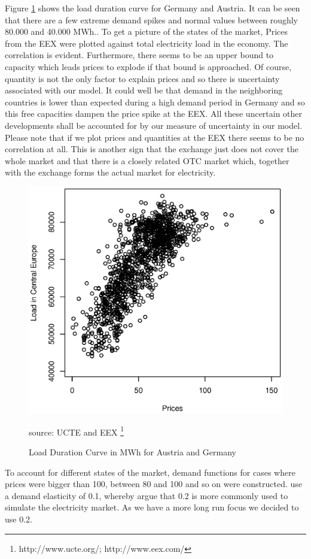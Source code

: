Figure \ref{fig:ldc} shows the load duration curve for Germany and Austria. It can be seen that there are a few extreme demand spikes and normal values between roughly 80.000 and 40.000 MWh.. To get a picture of the states of the market, Prices from the EEX were plotted against total electricity load in the economy. The correlation is evident. Furthermore, there seems to be an upper bound to capacity which leads prices to explode if that bound is approached. Of course, quantity is not the only factor to explain prices and so there is uncertainty associated with our model. It could well be that demand in the neighboring countries is lower than expected during a high demand period in Germany and so this free capacities dampen the price spike at the EEX. All these uncertain other developments shall be accounted for by our measure of uncertainty in our model. Please note that if we plot prices and quantities at the EEX there seems to be no correlation at all. This is another sign that the exchange just does not cover the whole market and that there is a closely related OTC market which, together with the exchange forms the actual market for electricity.
\begin{figure}[h]
\centering
\includegraphics[width=.5\textwidth]{data/korrelation}
      \label{fig:ldc}
      \caption{Load Duration Curve in MWh for Austria and Germany}
      source: UCTE and EEX \footnote{http://www.ucte.org/; http://www.eex.com/}
\end{figure}
To account for different states of the market, demand functions for cases where prices were bigger than 100, between 80 and 100 and so on were constructed. \cite{Neuhoff2005} use a demand elasticity of 0.1, whereby \cite{Genc2007} argue that 0.2 is more commonly used to simulate the electricity market. As we have a more long run focus we decided to use 0.2.

